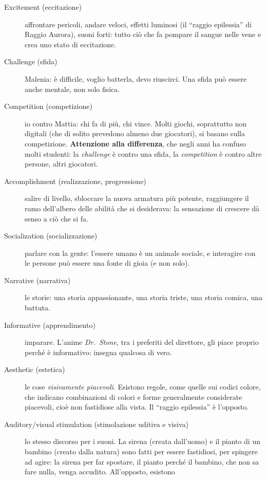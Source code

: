 \begin{description}
  \item[Excitement (eccitazione)] affrontare pericoli, andare veloci, effetti
        luminosi (il ``raggio epilessia'' di Raggio Aurora), suoni forti: tutto
        ciò che fa pompare il sangue nelle vene e crea uno stato di
        eccitazione.
  \item[Challenge (sfida)] Malenia: è difficile, voglio batterla, devo
        riuscirci. Una sfida può essere anche mentale, non solo fisica.
  \item[Competition (competizione)] io contro Mattia: chi fa di più, chi
        vince. Molti giochi, soprattutto non digitali (che di solito prevedono
        almeno due giocatori), si basano sulla competizione. \textbf{Attenzione
        alla differenza}, che negli anni ha confuso molti studenti: la
        \emph{challenge} è contro una sfida, la \emph{competition} è contro
        altre persone, altri giocatori.
  \item[Accomplishment (realizzazione, progressione)] salire di livello,
        sbloccare la nuova armatura più potente, raggiungere il ramo
        dell'albero delle abilità che si desiderava: la sensazione di crescere
        dà senso a ciò che si fa.
  \item[Socialization (socializzazione)] parlare con la gente: l'essere umano
        è un animale sociale, e interagire con le persone può essere una fonte
        di gioia (e non solo).
  \item[Narrative (narrativa)] le storie: una storia appassionante, una
        storia triste, una storia comica, una battuta.
  \item[Informative (apprendimento)] imparare. L'anime \emph{Dr.\ Stone},
        tra i preferiti del direttore, gli piace proprio perché è informativo:
        insegna qualcosa di vero.
  \item[Aesthetic (estetica)] le cose \emph{visivamente piacevoli}. Esistono
        regole, come quelle sui codici colore, che indicano combinazioni di
        colori e forme generalmente considerate piacevoli, cioè non fastidiose
        alla vista. Il ``raggio epilessia'' è l'opposto.
  \item[Auditory/visual stimulation (stimolazione uditiva e visiva)] lo stesso
        discorso per i suoni. La sirena (creata dall'uomo) e il pianto di un
        bambino (creato dalla natura) sono fatti per essere fastidiosi, per
        spingere ad agire: la sirena per far spostare, il pianto perché il
        bambino, che non sa fare nulla, venga accudito. All'opposto, esistono

\end{description}
